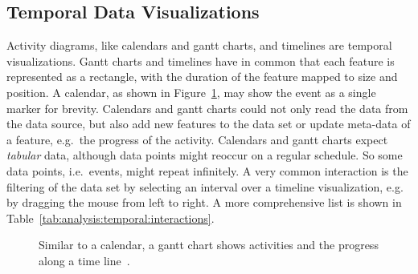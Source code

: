 \subsection{Temporal Data Visualizations}

Activity diagrams, like calendars and gantt charts, and timelines are temporal visualizations.
Gantt charts and timelines have in common that each feature is represented as a rectangle, with the duration of the feature mapped to size and position.
A calendar, as shown in Figure~\ref{fig:analysis:temporal}, may show the event as a single marker for brevity.
Calendars and gantt charts could not only read the data from the data source, but also add new features to the data set or update meta-data of a feature, e.g.\ the progress of the activity.
Calendars and gantt charts expect \emph{tabular} data, although data points might reoccur on a regular schedule.
So some data points, i.e.\ events, might repeat infinitely.
A very common interaction is the filtering of the data set by selecting an interval over a timeline visualization, e.g. by dragging the mouse from left to right.
A more comprehensive list is shown in Table~\ref{tab:analysis:temporal:interactions}.

\begin{figure}
  \centering
  \qquad
  \caption{Similar to a calendar, a gantt chart shows activities and the progress along a time line~\parencite{VisualizationCatalogue2017}.}%
  \label{fig:analysis:temporal}
\end{figure}


